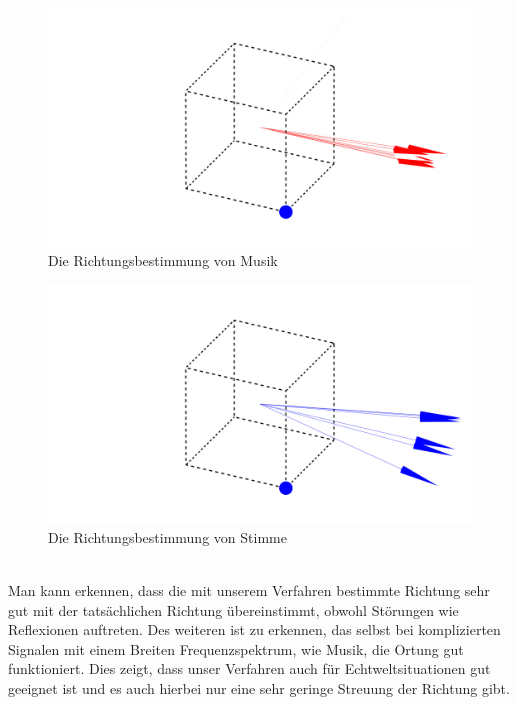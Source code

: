\begin{minipage}{0.49\linewidth}
\begin{figure}[H]
	\hfill
	\centering
	\includegraphics[width=\textwidth]{img/music.png}
	\caption{Die Richtungsbestimmung von Musik}
	\label{fig:music}
\end{figure}
\end{minipage}
\begin{minipage}{0.49\linewidth}
\begin{figure}[H]
	\hfill
	\centering
	\includegraphics[width=\textwidth]{img/sprechen.png}
	\caption{Die Richtungsbestimmung von Stimme}
	\label{fig:speech}
\end{figure}
\end{minipage}
\vspace{10pt}
\\
Man kann erkennen, dass die mit unserem Verfahren bestimmte Richtung sehr gut mit der tatsächlichen Richtung übereinstimmt, obwohl Störungen wie Reflexionen auftreten. Des weiteren ist zu erkennen, das selbst bei komplizierten Signalen mit einem Breiten Frequenzspektrum, wie Musik, die Ortung gut funktioniert. Dies zeigt, dass unser Verfahren auch für Echtweltsituationen gut geeignet ist und es auch hierbei nur eine sehr geringe Streuung der Richtung gibt.